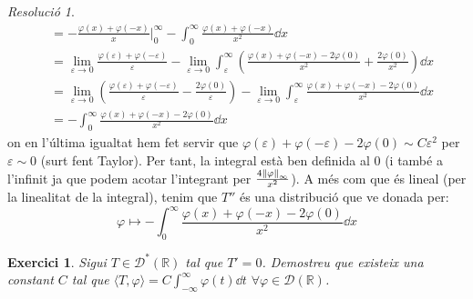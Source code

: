\documentclass[10pt,a4paper]{article}
\newcommand{\RR}{\ensuremath{\mathbb{R}}} %
\newtheorem{exercici}{Exercici}
\theoremstyle{definition}
\theoremstyle{remark}
\newtheorem*{res}{Resolució}
\begin{document}
\begin{res}
\begin{align*}
                                                                                  & =-\frac{\varphi(x)+\varphi(-x)}{x}\bigg|_0^\infty-\int_0^\infty \frac{\varphi(x)+\varphi(-x)}{x^2}\dd{x}                                                                                                                                \\
                                                                                  & =\lim_{\varepsilon\to 0}\frac{\varphi(\varepsilon)+\varphi(-\varepsilon)}{\varepsilon}-\lim_{\varepsilon\to 0}\int_\varepsilon^\infty \left(\frac{\varphi(x)+\varphi(-x)-2\varphi(0)}{x^2}+\frac{2\varphi(0)}{x^2}\right)\dd{x}         \\
                                                                                  & =\lim_{\varepsilon\to 0}\left(\frac{\varphi(\varepsilon)+\varphi(-\varepsilon)}{\varepsilon}-\frac{2\varphi(0)}{\varepsilon}\right)-\lim_{\varepsilon\to 0}\int_\varepsilon^\infty \frac{\varphi(x)+\varphi(-x)-2\varphi(0)}{x^2}\dd{x} \\
                                                                                  & =-\int_0^\infty \frac{\varphi(x)+\varphi(-x)-2\varphi(0)}{x^2}\dd{x}
  \end{align*}
  on en l'última igualtat hem fet servir que $\varphi(\varepsilon)+\varphi(-\varepsilon)-2\varphi(0)\sim C\varepsilon^2$ per $\varepsilon\sim 0$ (surt fent Taylor). Per tant, la integral està ben definida al 0 (i també a l'infinit ja que podem acotar l'integrant per $\frac{4\norm{\varphi}_\infty}{x^2}$). A més com que és lineal (per la linealitat de la integral), tenim que $T''$ és una distribució que ve donada per:
  $$
    \varphi\longmapsto -\int_0^\infty \frac{\varphi(x)+\varphi(-x)-2\varphi(0)}{x^2}\dd{x}
  $$
\end{res}
\begin{exercici}
  Sigui $T\in \mathcal{D}^*(\RR)$ tal que $T'=0$. Demostreu que existeix una constant $C$ tal que $\langle T,\varphi\rangle=C\int_{-\infty}^{\infty} \varphi(t)\dd{t}$ $\forall \varphi\in\mathcal{D}(\RR)$.
\end{exercici}
\end{document}
